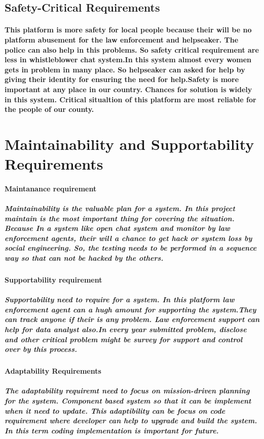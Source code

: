 \documentclass{article}
\begin{document}
\subsection{Safety-Critical Requirements}
\paragraph{This platform is more safety for local people because their will be no platform abusement for the law enforcement and helpseaker. The police can also help in this problems. So safety critical requirement are less in whistleblower
 chat system.In this system almost every women gets in problem in many place. So helpseaker can asked for help by giving their identity for ensuring the need for help.Safety is more important at any place in our country. Chances for solution is 
widely in this system. Critical situaltion of this platform are most reliable for the people of our county.}

\newpage
\section{Maintainability and Supportability Requirements}
\paragraph{Maintanance requirement}
\subparagraph{Maintainability is the valuable plan for a system. In this project maintain is the most important thing for covering the situation.
Because In a system like open chat system and monitor by law enforcement agents, their will a chance to get hack or system loss by social engineering.
So, the testing needs to be performed in a sequence way so that can not be hacked by the others.}

\paragraph{Supportability requirement}
\subparagraph{Supportability need to require for a system. In this platform law enforcement agent can a hugh amount for supporting the system.They can track anyone if their is any problem.
Law enforcement support can help for data analyst also.In every year submitted problem, disclose and other critical problem might be survey for support and control over by this process.}

\paragraph{Adaptability Requirements}
\subparagraph{The adaptability requiremt need to focus on mission-driven planning for the system. Component based system so that 
it can be implement when it need to update. This adaptibility can be focus on code requirement where developer can help to upgrade and build the system. In this term coding implementation is important for future.}
\end{document}
